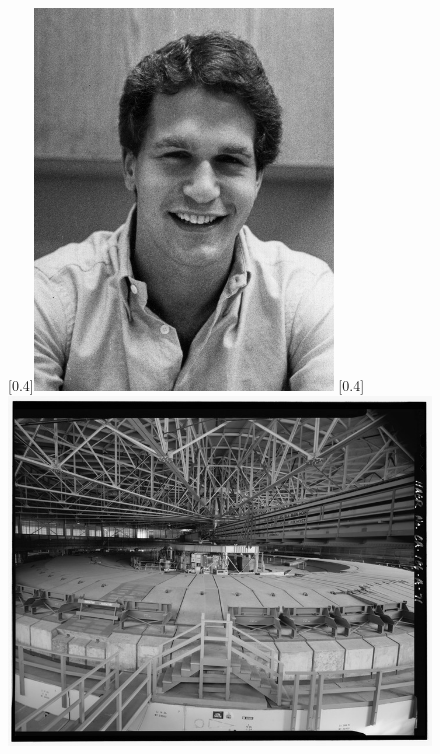 \begin{figure}[H]
    \centering
    [0.4\linewidth]{\includegraphics[width=0.9\linewidth]{images/SCP-001-atonement-5.jpg}}
    [0.4\linewidth]{\includegraphics[width=0.9\linewidth]{images/SCP-001-atonement-6.jpg}}
\end{figure}

